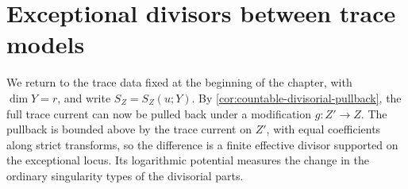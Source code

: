 \section{Exceptional divisors between trace models}
\label{sec:trace-exceptional-divisors}

We return to the trace data fixed at the beginning of the chapter, with $\dim Y=r$, and write $S_Z=S_Z(u;Y)$. By \cref{cor:countable-divisorial-pullback}, the full trace current can now be pulled back under a modification $g\colon Z'\to Z$. The pullback is bounded above by the trace current on $Z'$, with equal coefficients along strict transforms, so the difference is a finite effective divisor supported on the exceptional locus. Its logarithmic potential measures the change in the ordinary singularity types of the divisorial parts.

